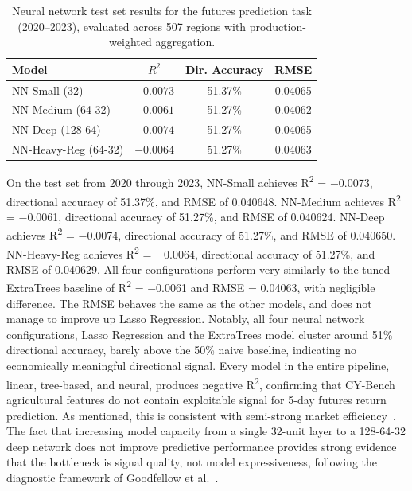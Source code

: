 \documentclass[pdflatex,sn-mathphys-num, oneside, 11pt]{sn-jnl}%
\theoremstyle{thmstyleone}%
\theoremstyle{thmstyletwo}%
\theoremstyle{thmstylethree}%
\begin{document}
\begin{table}[ht!]
\centering
\caption{Neural network test set results for the futures prediction task (2020--2023), evaluated across 507 regions with production-weighted aggregation.}
\label{tab:nn_futures}
\setlength{\tabcolsep}{12pt}
\begin{tabular}{lccc}
\toprule
\textbf{Model} & \textbf{$R^2$} & \textbf{Dir. Accuracy} & \textbf{RMSE} \\
\midrule
NN-Small (32)        & $-0.0073$ & 51.37\% & 0.04065 \\
NN-Medium (64-32)    & $-0.0061$ & 51.27\% & 0.04062 \\
NN-Deep (128-64)     & $-0.0074$ & 51.27\% & 0.04065 \\
NN-Heavy-Reg (64-32) & $-0.0064$ & 51.27\% & 0.04063 \\
\bottomrule
\end{tabular}
\end{table}
On the test set from 2020 through 2023, NN-Small achieves R\textsuperscript{2} = $-$0.0073, directional accuracy of 51.37\%, and RMSE of 0.040648. NN-Medium achieves R\textsuperscript{2} = $-$0.0061, directional accuracy of 51.27\%, and RMSE of 0.040624. NN-Deep achieves R\textsuperscript{2} = $-$0.0074, directional accuracy of 51.27\%, and RMSE of 0.040650. NN-Heavy-Reg achieves R\textsuperscript{2} = $-$0.0064, directional accuracy of 51.27\%, and RMSE of 0.040629. All four configurations perform very similarly to the tuned ExtraTrees baseline of R\textsuperscript{2} = $-$0.0061 and RMSE = 0.04063, with negligible difference. The RMSE behaves the same as the other models, and does not manage to improve up Lasso Regression. Notably, all four neural network configurations, Lasso Regression and the ExtraTrees model cluster around 51\% directional accuracy, barely above the 50\% naive baseline, indicating no economically meaningful directional signal. Every model in the entire pipeline, linear, tree-based, and neural, produces negative R\textsuperscript{2}, confirming that CY-Bench agricultural features do not contain exploitable signal for 5-day futures return prediction. As mentioned, this is consistent with semi-strong market efficiency~\cite{bib30}. The fact that increasing model capacity from a single 32-unit layer to a 128-64-32 deep network does not improve predictive performance provides strong evidence that the bottleneck is signal quality, not model expressiveness, following the diagnostic framework of Goodfellow et al.~\cite{bib_goodfellow}.\\
\end{document}
